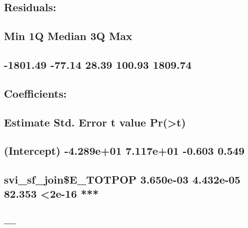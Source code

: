 \documentclass[
  12pt,
]{article}
\begin{document}
\hypertarget{residuals-1}{%
\subsection{Residuals:}\label{residuals-1}}

\hypertarget{min-1q-median-3q-max-1}{%
\subsection{Min 1Q Median 3Q Max}\label{min-1q-median-3q-max-1}}

\hypertarget{section-16}{%
\subsection{-1801.49 -77.14 28.39 100.93 1809.74}\label{section-16}}

\hypertarget{section-17}{%
\subsection{}\label{section-17}}

\hypertarget{coefficients-1}{%
\subsection{Coefficients:}\label{coefficients-1}}

\hypertarget{estimate-std.-error-t-value-prt-1}{%
\subsection{Estimate Std. Error t value
Pr(\textgreater\textbar t\textbar)}\label{estimate-std.-error-t-value-prt-1}}

\hypertarget{intercept--4.289e01-7.117e01--0.603-0.549}{%
\subsection{(Intercept) -4.289e+01 7.117e+01 -0.603
0.549}\label{intercept--4.289e01-7.117e01--0.603-0.549}}

\hypertarget{svi_sf_joine_totpop-3.650e-03-4.432e-05-82.353-2e-16}{%
\subsection{svi\_sf\_join\$E\_TOTPOP 3.650e-03 4.432e-05 82.353
\textless2e-16
***}\label{svi_sf_joine_totpop-3.650e-03-4.432e-05-82.353-2e-16}}

\hypertarget{section-18}{%
\subsection{---}\label{section-18}}
\end{document}
